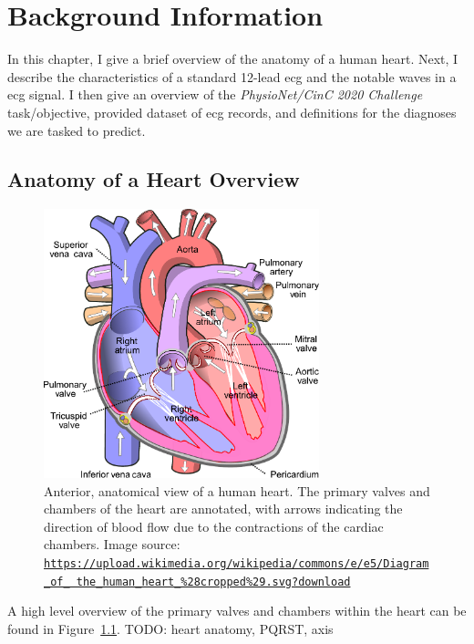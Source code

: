 \documentclass[\main/thesis.tex]{subfiles}
\begin{document}
\chapter{Background Information}
\label{chp:background}

In this chapter, I give a brief overview of the anatomy of a human heart.
Next, I describe the characteristics of a standard 12-lead \gls{ecg} and the notable waves in a \gls{ecg} signal.
I then give an overview of the \emph{PhysioNet/CinC 2020 Challenge} task/objective, provided dataset of \gls{ecg} records, and definitions for the diagnoses we are tasked to predict.

\section{Anatomy of a Heart Overview}

\begin{figure}[ht]
    \centering
    \includegraphics[width=8cm]{figure/Diagram_of_the_human_heart.pdf}
    \caption[Anterior, anatomical view of a human heart.]{Anterior, anatomical view of a human heart. The primary valves and chambers of the heart are annotated, with arrows indicating the direction of blood flow due to the contractions of the cardiac chambers. Image source: \href{https://upload.wikimedia.org/wikipedia/commons/e/e5/Diagram\_of\_the\_human\_heart\_\%28cropped\%29.svg?download}{\tt https://upload.wikimedia.org/wikipedia/commons/e/e5/Diagram\_of\_ the\_human\_heart\_\%28cropped\%29.svg?download}
    }
    \label{fig:heart_anatomy}
\end{figure}

A high level overview of the primary valves and chambers within the heart can be found in Figure~\ref{fig:heart_anatomy}.
TODO: heart anatomy, PQRST, axis
\end{document}
